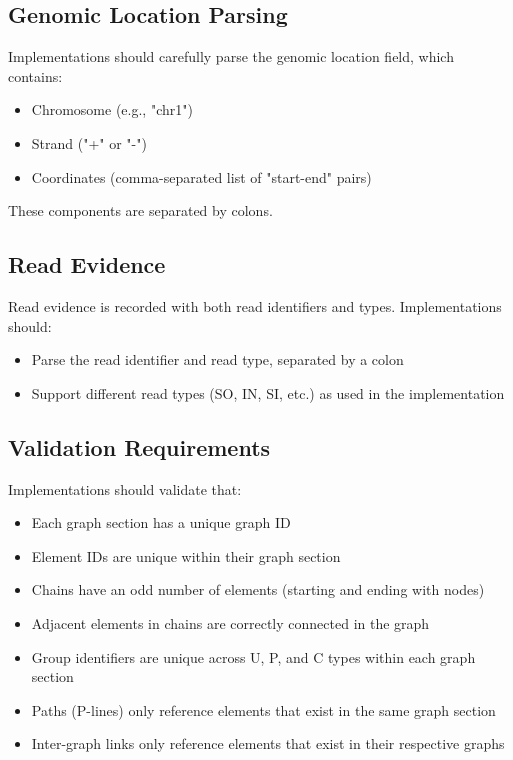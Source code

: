 \documentclass{article}
\begin{document}
\subsection{Genomic Location Parsing}

Implementations should carefully parse the genomic location field, which contains:

\begin{itemize}
	\item Chromosome (e.g., "chr1")
	\item Strand ("+" or "-")
	\item Coordinates (comma-separated list of "start-end" pairs)
\end{itemize}

These components are separated by colons.

\subsection{Read Evidence}

Read evidence is recorded with both read identifiers and types. Implementations should:

\begin{itemize}
	\item Parse the read identifier and read type, separated by a colon
	\item Support different read types (SO, IN, SI, etc.) as used in the implementation
\end{itemize}

\subsection{Validation Requirements}

Implementations should validate that:

\begin{itemize}
	\item Each graph section has a unique graph ID
	\item Element IDs are unique within their graph section
	\item Chains have an odd number of elements (starting and ending with nodes)
	\item Adjacent elements in chains are correctly connected in the graph
	\item Group identifiers are unique across U, P, and C types within each graph section
	\item Paths (P-lines) only reference elements that exist in the same graph section
	\item Inter-graph links only reference elements that exist in their respective graphs
\end{itemize}
\end{document}
